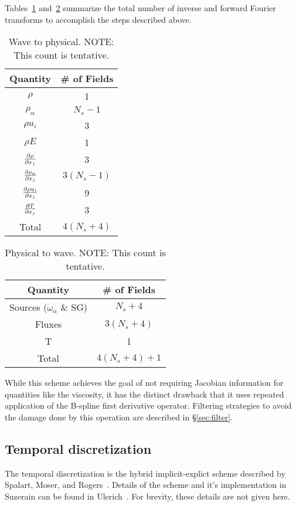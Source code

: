Tables~\ref{tbl:w2p} and~\ref{tbl:p2w} summarize the total number of
inverse and forward Fourier transforms to accomplish the steps
described above.
%
\begin{table}[ht]
\caption{Wave to physical.  NOTE: This count is tentative.}
\begin{tabular}{|c|c|}
\hline
Quantity & \# of Fields \\
\hline
\hline
$\rho$ & 1 \\
$\rho_{\alpha}$ & $N_s - 1$ \\
$\rho u_i$ & 3 \\
$\rho E$ & 1 \\
$\frac{\partial \rho}{\partial x_j}$ & 3 \\
$\frac{\partial \rho_{\alpha}}{\partial x_j}$ & $3 (N_s - 1)$ \\
$\frac{\partial \rho u_i}{\partial x_j}$ & 9 \\
$\frac{\partial T}{\partial x_j}$ & 3 \\
\hline
Total & $4(N_s + 4)$\\
\hline
\end{tabular}
\label{tbl:w2p}
\end{table}
% 
%
\begin{table}[ht]
\caption{Physical to wave.  NOTE: This count is tentative.}
\begin{tabular}{|c|c|}
\hline
Quantity & \# of Fields \\
\hline
\hline
Sources ($\dot{\omega}_{\alpha}$ \& SG) & $N_s + 4$ \\
Fluxes & $3 (N_s +4)$ \\
T & 1 \\
\hline
Total & $4(N_s + 4) + 1$\\
\hline
\end{tabular}
\label{tbl:p2w}
\end{table}
% 

While this scheme achieves the goal of not requiring Jacobian
information for quantities like the viscosity, it has the distinct
drawback that it uses repeated application of the B-spline first
derivative operator.  Filtering strategies to avoid the damage done by
this operation are described in \S\ref{sec:filter}.


\subsection{Temporal discretization}
\label{sec:temporal_discretization}
The temporal discretization is the hybrid implicit-explict scheme
described by Spalart, Moser, and Rogers~\cite{spalart_lowstoragerk}.
Details of the scheme and it's implementation in Suzerain can be found
in Ulerich~\cite{Ulerich_SZPerfect}.  For brevity, these details are
not given here.

